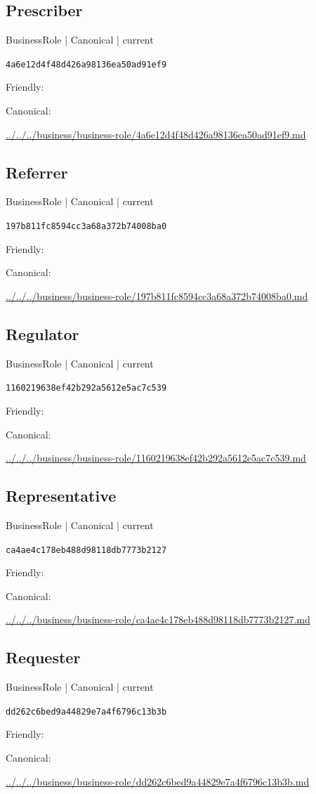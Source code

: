 \documentclass[10pt,a4paper]{article}
\begin{document}
\subsection*{Prescriber}
{\small BusinessRole | Canonical | current}\par
\texttt{4a6e12d4f48d426a98136ea50ad91ef9}\par
Friendly: \par
Canonical: \par
{\footnotesize\url{../../../business/business-role/4a6e12d4f48d426a98136ea50ad91ef9.md}}\par
\subsection*{Referrer}
{\small BusinessRole | Canonical | current}\par
\texttt{197b811fc8594cc3a68a372b74008ba0}\par
Friendly: \par
Canonical: \par
{\footnotesize\url{../../../business/business-role/197b811fc8594cc3a68a372b74008ba0.md}}\par
\subsection*{Regulator}
{\small BusinessRole | Canonical | current}\par
\texttt{1160219638ef42b292a5612e5ac7c539}\par
Friendly: \par
Canonical: \par
{\footnotesize\url{../../../business/business-role/1160219638ef42b292a5612e5ac7c539.md}}\par
\subsection*{Representative}
{\small BusinessRole | Canonical | current}\par
\texttt{ca4ae4c178eb488d98118db7773b2127}\par
Friendly: \par
Canonical: \par
{\footnotesize\url{../../../business/business-role/ca4ae4c178eb488d98118db7773b2127.md}}\par
\subsection*{Requester}
{\small BusinessRole | Canonical | current}\par
\texttt{dd262c6bed9a44829e7a4f6796c13b3b}\par
Friendly: \par
Canonical: \par
{\footnotesize\url{../../../business/business-role/dd262c6bed9a44829e7a4f6796c13b3b.md}}\par
\end{document}
